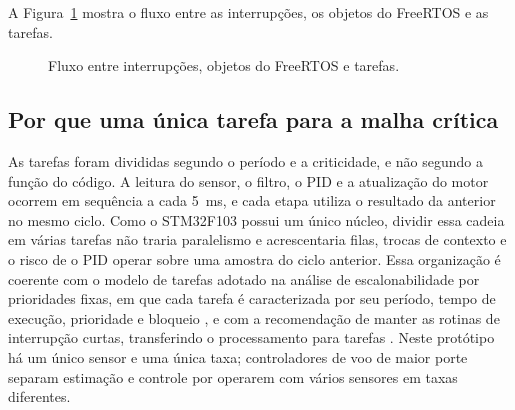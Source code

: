 A Figura~\ref{fig:fluxogeral} mostra o fluxo entre as interrupções, os objetos do FreeRTOS e as tarefas.

\begin{figure}[H]
\centering\caption{Fluxo entre interrupções, objetos do FreeRTOS e tarefas.}\label{fig:fluxogeral}
\end{figure}

\subsection{Por que uma única tarefa para a malha crítica}

As tarefas foram divididas segundo o período e a criticidade, e não segundo a função do código. A leitura do sensor, o filtro, o PID e a atualização do motor ocorrem em sequência a cada 5~ms, e cada etapa utiliza o resultado da anterior no mesmo ciclo. Como o STM32F103 possui um único núcleo, dividir essa cadeia em várias tarefas não traria paralelismo e acrescentaria filas, trocas de contexto e o risco de o PID operar sobre uma amostra do ciclo anterior. Essa organização é coerente com o modelo de tarefas adotado na análise de escalonabilidade por prioridades fixas, em que cada tarefa é caracterizada por seu período, tempo de execução, prioridade e bloqueio \cite[p.~369--370]{burns2009}, e com a recomendação de manter as rotinas de interrupção curtas, transferindo o processamento para tarefas \cite{barry2016}. Neste protótipo há um único sensor e uma única taxa; controladores de voo de maior porte separam estimação e controle por operarem com vários sensores em taxas diferentes.


